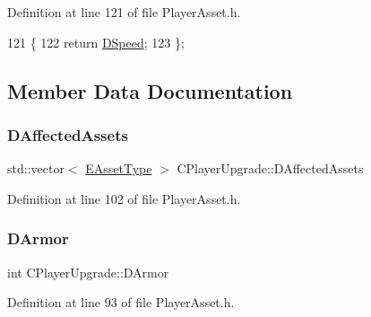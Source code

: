 Definition at line 121 of file Player\+Asset.\+h.


\begin{DoxyCode}
121                          \{
122             \textcolor{keywordflow}{return} \hyperlink{classCPlayerUpgrade_a3907be12aac44c8606d1d3542446ecdc}{DSpeed};  
123         \};
\end{DoxyCode}


\subsection{Member Data Documentation}
\hypertarget{classCPlayerUpgrade_adf7bd5e0d37611eb17cccd4ffa789ae6}{}\label{classCPlayerUpgrade_adf7bd5e0d37611eb17cccd4ffa789ae6} 
\subsubsection{\texorpdfstring{D\+Affected\+Assets}{DAffectedAssets}}
{\footnotesize\ttfamily std\+::vector$<$ \hyperlink{GameDataTypes_8h_a5600d4fc433b83300308921974477fec}{E\+Asset\+Type} $>$ C\+Player\+Upgrade\+::\+D\+Affected\+Assets\hspace{0.3cm}{\ttfamily [protected]}}



Definition at line 102 of file Player\+Asset.\+h.

\hypertarget{classCPlayerUpgrade_af6ec93ed116043353690363f46957eef}{}\label{classCPlayerUpgrade_af6ec93ed116043353690363f46957eef} 
\subsubsection{\texorpdfstring{D\+Armor}{DArmor}}
{\footnotesize\ttfamily int C\+Player\+Upgrade\+::\+D\+Armor\hspace{0.3cm}{\ttfamily [protected]}}



Definition at line 93 of file Player\+Asset.\+h.

\hypertarget{classCPlayerUpgrade_a914ae5e3de84921eaf060b5696478489}{}\label{classCPlayerUpgrade_a914ae5e3de84921eaf060b5696478489} 
